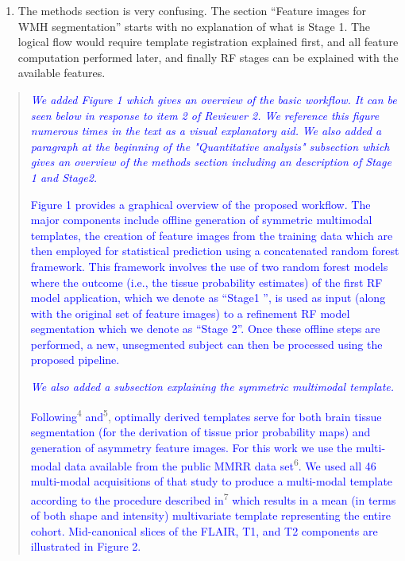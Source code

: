 \documentclass[12pt,]{article}
\providecommand{\tightlist}{%
  \setlength{\itemsep}{0pt}\setlength{\parskip}{0pt}}
\begin{document}
\begin{enumerate}
\def\labelenumi{\arabic{enumi}.}
\setcounter{enumi}{5}
\tightlist
\item
  The methods section is very confusing. The section ``Feature images
  for WMH segmentation'' starts with no explanation of what is Stage 1.
  The logical flow would require template registration explained first,
  and all feature computation performed later, and finally RF stages can
  be explained with the available features.
\end{enumerate}

\begin{quote}
\emph{\textcolor{blue}{We added Figure 1 which gives an overview of the basic workflow.
  It can be seen below in response to item 2 of Reviewer 2.  We reference
  this figure numerous times in the text as a visual explanatory aid.}}
\emph{\textcolor{blue}{We also added a paragraph at the beginning of the "Quantitative analysis" subsection
  which gives an overview of the methods section including an description of Stage 1 and Stage2.}}

\textcolor{blue}{Figure 1 provides a graphical overview of the proposed workflow.  The major components
include offline generation of symmetric multimodal templates, the creation of
feature images from the training data which are then employed for statistical
prediction using a concatenated random forest framework.  This framework involves
the use of two random forest models where the outcome (i.e., the tissue
probability estimates) of the first RF model application,
which we denote as ``Stage1 '', is used as input (along with the original set of
feature images) to a refinement RF model segmentation which we denote as ``Stage 2''.
Once these offline steps
are performed, a new, unsegmented subject can then be processed using the proposed pipeline.}

\emph{\textcolor{blue}{We also added a subsection explaining the symmetric multimodal template.}}

\textcolor{blue}{Following}\textsuperscript{4}
\textcolor{blue}{and}\textsuperscript{5},
\textcolor{blue}{optimally derived templates
serve for both brain tissue segmentation (for the derivation of tissue prior probability maps) and generation of asymmetry feature images.
For this work we use the multi-modal data available from the public MMRR data set}\textsuperscript{6}\textcolor{blue}{.  We used all 46 multi-modal acquisitions of that study to produce a multi-modal template according to the procedure described in}\textsuperscript{7}
\textcolor{blue}{which
results in a mean (in terms of both shape and intensity) multivariate template representing the entire cohort.  Mid-canonical slices of the FLAIR, T1, and T2 components are illustrated in Figure 2.}
\end{quote}
\end{document}
